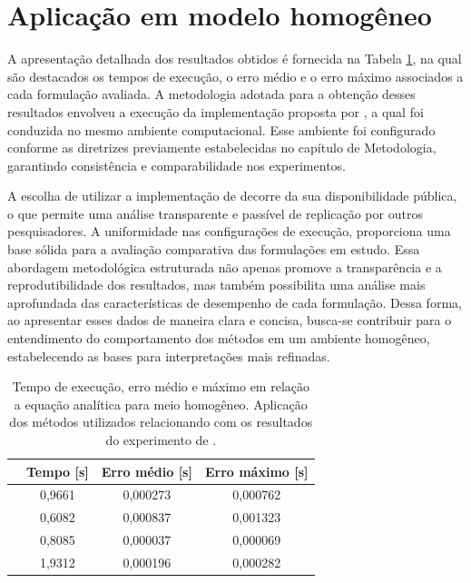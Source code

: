 \section{Aplicação em modelo homogêneo}

A apresentação detalhada dos resultados obtidos é fornecida na Tabela \ref{table_homog}, na qual são destacados os tempos de execução, o erro médio e o erro máximo associados a cada formulação avaliada. A metodologia adotada para a obtenção desses resultados envolveu a execução da implementação proposta por , a qual foi conduzida no mesmo ambiente computacional. Esse ambiente foi configurado conforme as diretrizes previamente estabelecidas no capítulo de Metodologia, garantindo consistência e comparabilidade nos experimentos.

A escolha de utilizar a implementação de  decorre da sua disponibilidade pública, o que permite uma análise transparente e passível de replicação por outros pesquisadores. A uniformidade nas configurações de execução, proporciona uma base sólida para a avaliação comparativa das formulações em estudo. Essa abordagem metodológica estruturada não apenas promove a transparência e a reprodutibilidade dos resultados, mas também possibilita uma análise mais aprofundada das características de desempenho de cada formulação. Dessa forma, ao apresentar esses dados de maneira clara e concisa, busca-se contribuir para o entendimento do comportamento dos métodos em um ambiente homogêneo, estabelecendo as bases para interpretações mais refinadas.

\begin{table}[H]
	\caption{Tempo de execução, erro médio e máximo em relação a equação analítica para meio homogêneo. Aplicação dos métodos utilizados relacionando com os resultados do experimento de .}
	\begin{tabular}{r|ccc}
		\multicolumn{1}{c|}{} & Tempo {[}s{]} & Erro médio {[}s{]} & Erro máximo {[}s{]} \\ \hline
		\citeonline{podvin1991finite} & 0,9661        & 0,000273           & 0,000762    \\ \hline
		\citeonline{jeong2008fast}    & 0,6082        & 0,000837           & 0,001323    \\ \hline
		\citeonline{noble2014accurate}& 0,8085        & 0,000037           & 0,000069    \\ \hline
		\citeonline{cai2023improved}  & 1,9312        & 0,000196           & 0,000282           
	\end{tabular}
	\label{table_homog}
\end{table}


